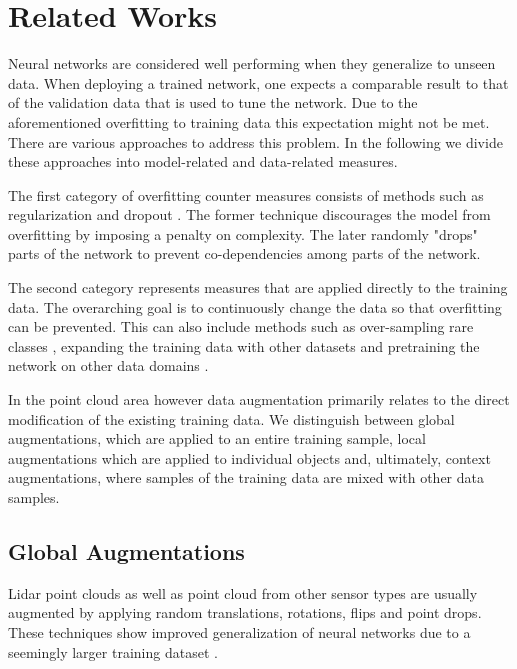 \documentclass[letterpaper, 10 pt, conference]{ieeeconf}
\begin{document}
\section{Related Works}
\label{section:related}
Neural networks are considered well performing when they generalize to unseen data. When deploying a trained network, one expects a comparable result to that of the validation data that is used to tune the network.
Due to the aforementioned overfitting to training data this expectation might not be met. There are various approaches to address this problem. In the following we divide these approaches into model-related and data-related measures. 

The first category of overfitting counter measures consists of methods such as regularization \cite{hanson1988comparing}\cite{weigend1991generalization} and dropout \cite{srivastava2014dropout}. The former technique discourages the model from overfitting by imposing a penalty on complexity. The later randomly "drops" parts of the network to prevent co-dependencies among parts of the network. 

The second category represents measures that are applied directly to the training data. The overarching goal is to continuously change the data so that overfitting can be prevented. This can also include methods such as over-sampling rare classes \cite{ling1998data}, expanding the training data with other datasets \cite{rame2018omnia} and pretraining the network on other data domains \cite{brekke2019multimodal}.

In the point cloud area however data augmentation primarily relates to the direct modification of the existing training data. We distinguish between global augmentations, which are applied to an entire training sample, local augmentations which are applied to individual objects and, ultimately, context augmentations, where samples of the training data are mixed with other data samples.

\subsection{Global Augmentations}
\label{section:related:global_augmentations}
Lidar point clouds as well as point cloud from other sensor types are usually augmented by applying random translations, rotations, flips and point drops. These techniques show improved generalization of neural networks due to a seemingly larger training dataset \cite{liong2020amvnet}\cite{yan2020sparse}. 
\end{document}

